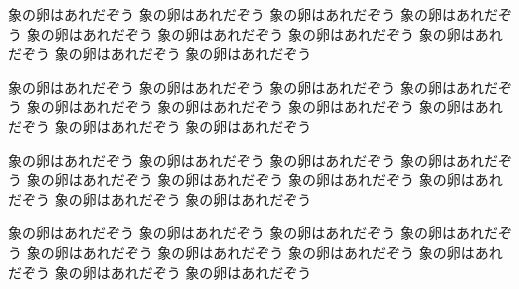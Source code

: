 
象の卵はあれだぞう
象の卵はあれだぞう
象の卵はあれだぞう
象の卵はあれだぞう
象の卵はあれだぞう
象の卵はあれだぞう
象の卵はあれだぞう
象の卵はあれだぞう
象の卵はあれだぞう
象の卵はあれだぞう

象の卵はあれだぞう
象の卵はあれだぞう
象の卵はあれだぞう
象の卵はあれだぞう
象の卵はあれだぞう
象の卵はあれだぞう
象の卵はあれだぞう
象の卵はあれだぞう
象の卵はあれだぞう
象の卵はあれだぞう

象の卵はあれだぞう
象の卵はあれだぞう
象の卵はあれだぞう
象の卵はあれだぞう
象の卵はあれだぞう
象の卵はあれだぞう
象の卵はあれだぞう
象の卵はあれだぞう
象の卵はあれだぞう
象の卵はあれだぞう

象の卵はあれだぞう
象の卵はあれだぞう
象の卵はあれだぞう
象の卵はあれだぞう
象の卵はあれだぞう
象の卵はあれだぞう
象の卵はあれだぞう
象の卵はあれだぞう
象の卵はあれだぞう
象の卵はあれだぞう

